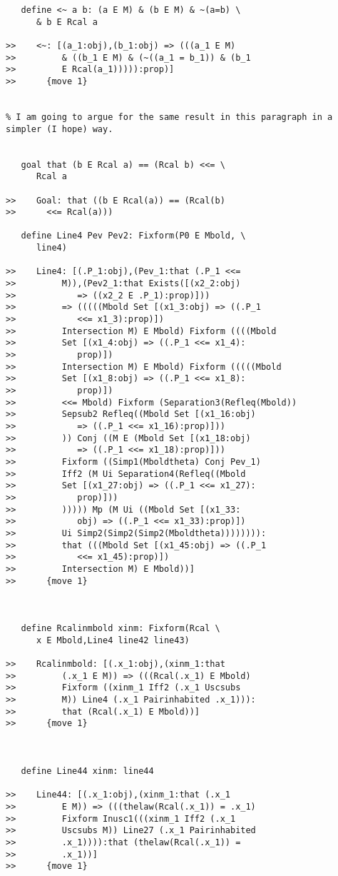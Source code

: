 \documentclass[12pt]{article}
\begin{document}
\begin{verbatim}
   define <~ a b: (a E M) & (b E M) & ~(a=b) \
      & b E Rcal a

>>    <~: [(a_1:obj),(b_1:obj) => (((a_1 E M)
>>         & ((b_1 E M) & (~((a_1 = b_1)) & (b_1
>>         E Rcal(a_1))))):prop)]
>>      {move 1}


% I am going to argue for the same result in this paragraph in a simpler (I hope) way.


   goal that (b E Rcal a) == (Rcal b) <<= \
      Rcal a

>>    Goal: that ((b E Rcal(a)) == (Rcal(b)
>>      <<= Rcal(a)))

   define Line4 Pev Pev2: Fixform(P0 E Mbold, \
      line4)

>>    Line4: [(.P_1:obj),(Pev_1:that (.P_1 <<=
>>         M)),(Pev2_1:that Exists([(x2_2:obj)
>>            => ((x2_2 E .P_1):prop)]))
>>         => (((((Mbold Set [(x1_3:obj) => ((.P_1
>>            <<= x1_3):prop)])
>>         Intersection M) E Mbold) Fixform ((((Mbold
>>         Set [(x1_4:obj) => ((.P_1 <<= x1_4):
>>            prop)])
>>         Intersection M) E Mbold) Fixform (((((Mbold
>>         Set [(x1_8:obj) => ((.P_1 <<= x1_8):
>>            prop)])
>>         <<= Mbold) Fixform (Separation3(Refleq(Mbold))
>>         Sepsub2 Refleq((Mbold Set [(x1_16:obj)
>>            => ((.P_1 <<= x1_16):prop)]))
>>         )) Conj ((M E (Mbold Set [(x1_18:obj)
>>            => ((.P_1 <<= x1_18):prop)]))
>>         Fixform ((Simp1(Mboldtheta) Conj Pev_1)
>>         Iff2 (M Ui Separation4(Refleq((Mbold
>>         Set [(x1_27:obj) => ((.P_1 <<= x1_27):
>>            prop)]))
>>         ))))) Mp (M Ui ((Mbold Set [(x1_33:
>>            obj) => ((.P_1 <<= x1_33):prop)])
>>         Ui Simp2(Simp2(Simp2(Mboldtheta)))))))):
>>         that (((Mbold Set [(x1_45:obj) => ((.P_1
>>            <<= x1_45):prop)])
>>         Intersection M) E Mbold))]
>>      {move 1}



   define Rcalinmbold xinm: Fixform(Rcal \
      x E Mbold,Line4 line42 line43)

>>    Rcalinmbold: [(.x_1:obj),(xinm_1:that
>>         (.x_1 E M)) => (((Rcal(.x_1) E Mbold)
>>         Fixform ((xinm_1 Iff2 (.x_1 Uscsubs
>>         M)) Line4 (.x_1 Pairinhabited .x_1))):
>>         that (Rcal(.x_1) E Mbold))]
>>      {move 1}



   define Line44 xinm: line44

>>    Line44: [(.x_1:obj),(xinm_1:that (.x_1
>>         E M)) => (((thelaw(Rcal(.x_1)) = .x_1)
>>         Fixform Inusc1(((xinm_1 Iff2 (.x_1
>>         Uscsubs M)) Line27 (.x_1 Pairinhabited
>>         .x_1)))):that (thelaw(Rcal(.x_1)) =
>>         .x_1))]
>>      {move 1}




\end{verbatim}
\end{document}
